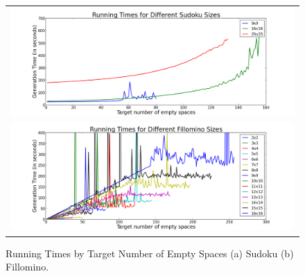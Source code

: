 \begin{figure}[!htpb]
\centering
\begin{tabular}{c}
 \includegraphics[scale=0.4]{experimentgraphs/SudokuRunTime3.png}
\\
\includegraphics[scale=0.4]{experimentgraphs/fillominoRunTime3.png}
\end{tabular}
\caption{Running Times by Target Number of Empty Spaces (a) Sudoku (b) Fillomino.}
\label{runtimes}
\end{figure}






